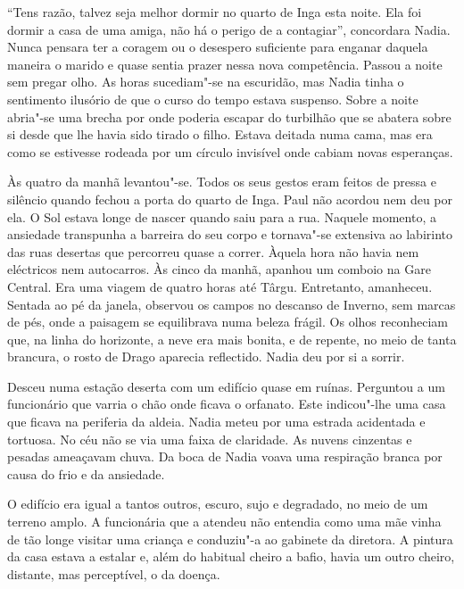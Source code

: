 ``Tens razão, talvez seja melhor dormir no quarto de Inga esta noite. Ela
foi dormir a casa de uma amiga, não há o perigo de a contagiar'',
concordara Nadia. Nunca pensara ter a coragem ou o desespero suficiente
para enganar daquela maneira o marido e quase sentia prazer nessa nova
competência. Passou a noite sem pregar olho. As horas sucediam"-se na
escuridão, mas Nadia tinha o sentimento ilusório de que o curso do tempo
estava suspenso. Sobre a noite abria"-se uma brecha por onde poderia
escapar do turbilhão que se abatera sobre si desde que lhe havia sido
tirado o filho. Estava deitada numa cama, mas era como se estivesse
rodeada por um círculo invisível onde cabiam novas esperanças.

Às quatro da manhã levantou"-se. Todos os seus gestos eram feitos de
pressa e silêncio quando fechou a porta do quarto de Inga. Paul não
acordou nem deu por ela. O Sol estava longe de nascer quando saiu para a
rua. Naquele momento, a ansiedade transpunha a barreira do seu corpo e
tornava"-se extensiva ao labirinto das ruas desertas que percorreu quase
a correr. Àquela hora não havia nem
eléctricos nem autocarros. Às cinco da manhã, apanhou um comboio na Gare
Central. Era uma viagem de quatro horas até Târgu. Entretanto,
amanheceu. Sentada ao pé da janela, observou os campos no descanso de
Inverno, sem marcas de pés, onde a paisagem se equilibrava numa beleza
frágil. Os olhos reconheciam que, na linha do horizonte, a neve era
mais bonita, e de repente, no meio de tanta brancura, o rosto de Drago
aparecia reflectido. Nadia deu por si a sorrir.

Desceu numa estação deserta com um edifício quase em ruínas. Perguntou a
um funcionário que varria o chão onde ficava o orfanato. Este
indicou"-lhe uma casa que ficava na periferia da aldeia. Nadia meteu por
uma estrada acidentada e tortuosa. No céu não se via uma faixa de
claridade. As nuvens cinzentas e pesadas ameaçavam chuva. Da boca de
Nadia voava uma respiração branca por causa do frio e da ansiedade.

\bigskip

O edifício era igual a tantos outros, escuro, sujo e degradado, no
meio de um terreno amplo. A funcionária que a atendeu não entendia como
uma mãe vinha de tão longe visitar uma criança e conduziu"-a ao gabinete
da diretora. A pintura da casa estava a estalar e, além do habitual
cheiro a bafio, havia um outro cheiro, distante, mas perceptível, o da
doença.

